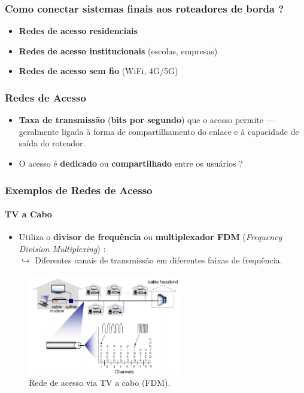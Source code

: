     \subsubsection*{Como conectar sistemas finais aos roteadores de borda ?}
    \begin{itemize}
        \item \textbf{Redes de acesso residenciais}
        \item \textbf{Redes de acesso institucionais} (escolas, empresas)
        \item \textbf{Redes de acesso sem fio} (WiFi, 4G/5G)
    \end{itemize}

    \subsubsection*{Redes de Acesso}
    \begin{itemize}
        \item \textbf{Taxa de transmissão} (\textbf{bits por segundo}) que o acesso permite — geralmente ligada à forma de compartilhamento do enlace e à capacidade de saída do roteador.
        \item O acesso é \textbf{dedicado} ou \textbf{compartilhado} entre os usuários ?
    \end{itemize}

    \subsubsection*{Exemplos de Redes de Acesso}

    \paragraph{TV a Cabo}
    \begin{itemize}
        \item Utiliza o \textbf{divisor de frequência} ou \textbf{multiplexador FDM} (\textit{Frequency Division Multiplexing}) : \\ 
            $\hookrightarrow$ Diferentes canais de transmissão em diferentes faixas de frequência.
    \end{itemize}

    \begin{figure}[H]
        \centering
        \includegraphics[width=0.6\textwidth]{img/cap-01/tv-a-cabo.png}
        \caption{Rede de acesso via TV a cabo (FDM).}
    \end{figure}

